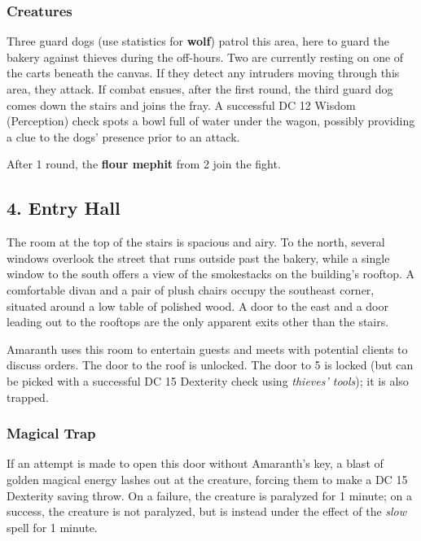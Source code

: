 \documentclass[10pt,a4paper,twoside,bg=print,twocolumn,openany,nodeprecatedcode]{dndbook}
\begin{document}
\subsubsection{Creatures}
Three guard dogs (use statistics for \textbf{wolf}) patrol this area, here to guard the bakery against thieves during the off-hours. Two are currently resting on one of the carts beneath the canvas. If they detect any intruders moving through this area, they attack. If combat ensues, after the first round, the third guard dog comes down the stairs and joins the fray. A successful DC 12 Wisdom (Perception) check spots a bowl full of water under the wagon, possibly providing a clue to the dogs' presence prior to an attack.

After 1 round, the \textbf{flour mephit} from 2 join the fight.

\subsection{4. Entry Hall}
\begin{DndReadAloud}{}
The room at the top of the stairs is spacious and airy. To the north, several windows overlook the street that runs outside past the bakery, while a single window to the south offers a view of the smokestacks on the building's rooftop. A comfortable divan and a pair of plush chairs occupy the southeast corner, situated around a low table of polished wood. A door to the east and a door leading out to the rooftops are the only apparent exits other than the stairs.

\end{DndReadAloud}

Amaranth uses this room to entertain guests and meets with potential clients to discuss orders. The door to the roof is unlocked. The door to 5 is locked (but can be picked with a successful DC 15 Dexterity check using \textit{thieves' tools}); it is also trapped.

\subsubsection{Magical Trap}
If an attempt is made to open this door without Amaranth's key, a blast of golden magical energy lashes out at the creature, forcing them to make a DC 15 Dexterity saving throw. On a failure, the creature is paralyzed for 1 minute; on a success, the creature is not paralyzed, but is instead under the effect of the \textit{slow} spell for 1 minute.
\end{document}
